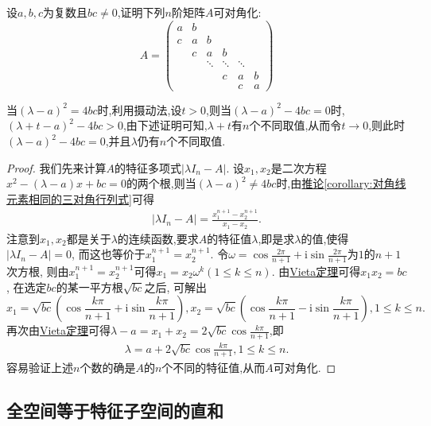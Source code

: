 \documentclass[../../main.tex]{subfiles}
\begin{document}
\begin{proposition}\label{proposition:三对角矩阵必可对角化}
设$a,b,c$为复数且$bc\neq0$,证明下列$n$阶矩阵$A$可对角化:
\[
A = 
\begin{pmatrix}
a&b&&&\\
c&a&b&&\\
&c&a&b&\\
&&\ddots&\ddots&\ddots\\
&&&c&a&b\\
&&&&c&a
\end{pmatrix}
\]
\end{proposition}
\begin{note}
当$(\lambda-a)^2=4bc$时,利用摄动法,设$t>0$,则当$(\lambda-a)^2-4bc=0$时,$(\lambda+t-a)^2-4bc>0$,由下述证明可知,$\lambda+t$有$n$个不同取值,从而令$t \to 0$,则此时$(\lambda-a)^2-4bc=0$,并且$\lambda$仍有$n$个不同取值.
\end{note}
\begin{proof}
我们先来计算$A$的特征多项式$|\lambda I_n - A|$. 设$x_1,x_2$是二次方程$x^2 - (\lambda - a)x + bc = 0$的两个根,则当$(\lambda-a)^2\ne 4bc$时,由\hyperref[corollary:对角线元素相同的三对角行列式]{推论\ref{corollary:对角线元素相同的三对角行列式}}可得
\begin{align*}
|\lambda I_n - A|=\frac{x_1^{n + 1}-x_2^{n + 1}}{x_1 - x_2}.
\end{align*}
注意到$x_1,x_2$都是关于$\lambda$的连续函数,要求$A$的特征值$\lambda$,即是求$\lambda$的值,使得$|\lambda I_n - A| = 0$, 而这也等价于$x_1^{n + 1}=x_2^{n + 1}$. 令$\omega=\cos\frac{2\pi}{n + 1}+\mathrm{i}\sin\frac{2\pi}{n + 1}$为$1$的$n + 1$次方根, 则由$x_1^{n + 1}=x_2^{n + 1}$可得$x_1 = x_2\omega^k(1\leq k\leq n)$. 由\hyperref[theorem:Vieta定理]{Vieta定理}可得$x_1x_2 = bc$, 在选定$bc$的某一平方根$\sqrt{bc}$之后, 可解出
\[
x_1=\sqrt{bc}\left(\cos\frac{k\pi}{n + 1}+\mathrm{i}\sin\frac{k\pi}{n + 1}\right), x_2=\sqrt{bc}\left(\cos\frac{k\pi}{n + 1}-\mathrm{i}\sin\frac{k\pi}{n + 1}\right), 1\leq k\leq n.
\]
再次由\hyperref[theorem:Vieta定理]{Vieta定理}可得$\lambda - a = x_1 + x_2 = 2\sqrt{bc}\cos\frac{k\pi}{n + 1}$,即
\begin{align*}
\lambda=a + 2\sqrt{bc}\cos\frac{k\pi}{n + 1}, 1\leq k\leq n.
\end{align*}
容易验证上述$n$个数的确是$A$的$n$个不同的特征值,从而$A$可对角化. 
\end{proof}


\subsection{全空间等于特征子空间的直和}
\end{document}
